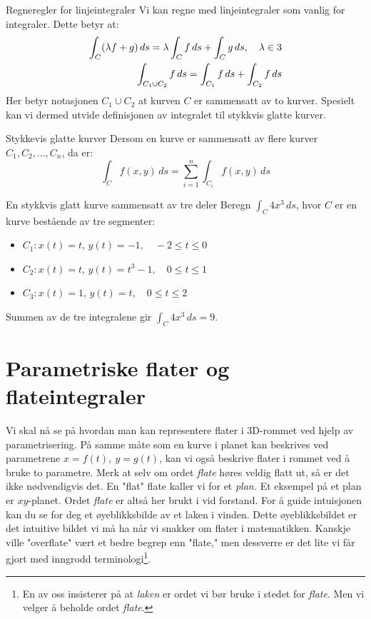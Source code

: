 \begin{oppsum}{Regneregler for linjeintegraler}
  Vi kan regne med linjeintegraler som vanlig for integraler. Dette betyr at:
  \begin{align}
  \int_C (\lambda f+g)\, ds = \lambda \int_C f \, ds + \int_C g \, ds, \quad \lambda \in 3 \label{lin_int_linear}\\
  \int_{C_1 \cup C_2} f \, ds = \int_{C_1} f \, ds + \int_{C_2} f \, ds \label{lin_int_add}
  \end{align}
  Her betyr notasjonen $C_1\cup C_2$ at kurven $C$ er sammensatt av to kurver. Spesielt kan vi dermed utvide definisjonen av integralet til stykkvis glatte kurver.
\end{oppsum}
\begin{rem}{Stykkevis glatte kurver}
Dersom en kurve er sammensatt av flere kurver \( C_1, C_2, \ldots, C_n \), da er:
\[
\int_C f(x, y)\, ds = \sum_{i=1}^n \int_{C_i} f(x, y)\, ds
\]
\end{rem}

\begin{eks}{En stykkvis glatt kurve sammensatt av tre deler}
Beregn \( \int_C 4x^3\, ds \), hvor \( C \) er en kurve bestående av tre segmenter:
\begin{itemize}
    \item \( C_1: x(t) = t,\, y(t) = -1,\quad -2 \leq t \leq 0 \)
    \item \( C_2: x(t) = t,\, y(t) = t^3 - 1,\quad 0 \leq t \leq 1 \)
    \item \( C_3: x(t) = 1,\, y(t) = t,\quad 0 \leq t \leq 2 \)
\end{itemize}
Summen av de tre integralene gir \( \int_C 4x^3\, ds = 9. \)
\end{eks}

\section{Parametriske flater og flateintegraler}\label{sect:flateint}

Vi skal nå se på hvordan man kan representere flater i 3D-rommet ved hjelp av parametrisering. På samme måte som en kurve i planet kan beskrives ved parametrene \( x = f(t),\ y = g(t) \), kan vi også beskrive flater i rommet ved å bruke to parametre. Merk at selv om ordet \textit{flate} høres veldig flatt ut, så er det ikke nødvendigvis det. En "flat" flate kaller vi for et \textit{plan.} Et eksempel på et plan er $xy$-planet. 
Ordet \textit{flate} er altså her brukt i vid forstand. For å guide intuisjonen kan du se for deg et øyeblikksbilde av et laken i vinden. Dette øyeblikksbildet er det intuitive bildet vi må ha når vi snakker om flater i matematikken. Kanskje ville "overflate" vært et bedre begrep enn "flate," men dessverre er det lite vi får gjort med inngrodd terminologi\footnote{En av oss insisterer på at \textit{laken} er ordet vi bør bruke i stedet for \textit{flate}. Men vi velger å beholde ordet \textit{flate}.}.


